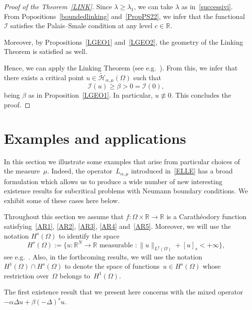 \documentclass[12pt,a4paper,intlimits,sumlimits]{amsart}
\def \R {\mathbb{R}}
\theoremstyle{definition}
\theoremstyle{plain}
\numberwithin{equation}{section}
\renewcommand{\ge}{\geqslant}
\begin{document}
\begin{proof}[Proof of the Theorem~\ref{LINK}]
Since $\lambda\ge \lambda_1$, we can take $\lambda$ as in~\eqref{successivi}. {F}rom Popositions~\ref{boundedlinking} and~\ref{PropPS22},
we infer that the functional~$\mathcal I$ satisfies the Palais--Smale condition at any level $c\in\R$.

Moreover, by Propositions~\ref{LGEO1} and~\ref{LGEO2}, the geometry of the Linking Theorem is satisfied as well. 

Hence, we can apply the Linking Theorem (see e.g.~\cite[Theorem~5.3]{MR845785}). {F}rom this, we infer that there exists a critical point $u\in\widetilde{\mathcal{H}}_{\alpha, \mu}(\Omega)$ such that
\[
\mathcal I(u)\ge\beta>0 = \mathcal I(0),
\]
being $\beta$ as in Proposition~\ref{LGEO1}. In particular, $u\not\equiv 0$. This concludes the proof.
\end{proof}

\section{Examples and applications}\label{sec:appex}

In this section we illustrate some examples that arise from particular choices of the measure~$\mu$.
Indeed, the operator~$L_{\alpha, \mu}$ introduced in~\eqref{ELLE} has a broad formulation which allows us to produce a wide number of new interesting existence results for subcritical problems with Neumann boundary conditions. We exhibit some of these cases here below.

Throughout this section we assume that $f:\Omega\times \R \to \R$ is a Carath\'eodory function satisfying~\eqref{AR1}, \eqref{AR2},  \eqref{AR3}, \eqref{AR4} and~\eqref{AR5}.  Moreover, we will use the notation $H^s(\Omega)$ to identify the space
\[
H^s(\Omega):=\Big\{u:\R^N\to\R \mbox{ measurable } : \|u\|_{L^2(\Omega)} + [u]_s <+\infty\Big\},
\]
see e.g.~\cite[Section~3]{MR3651008}. Also, in the forthcoming results, we will use the notation~$
H^1(\Omega)\cap H^s (\Omega)$
to denote the space of functions~$u\in H^s (\Omega)$ whose restriction over~$\Omega$ belongs to~$H^1(\Omega)$.

The first existence result that we present here concerns with the mixed operator $-\alpha\Delta u + \beta (-\Delta)^s u$. 
\end{document}

